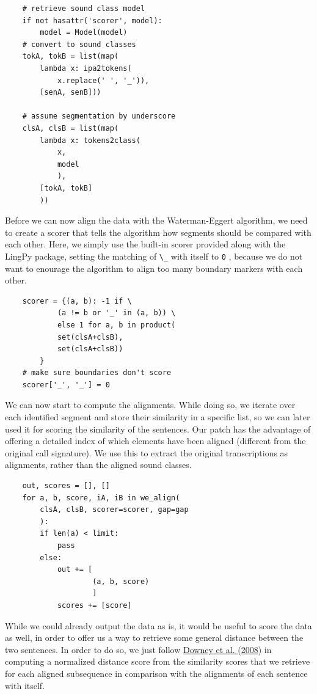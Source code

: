 \documentclass[
  a4paper,
  14pt,
  oneside,
  tablecaptionabove
]{scrbook}
\newcommand{\passthrough}[1]{#1}
\begin{document}
\begin{lstlisting}
    # retrieve sound class model
    if not hasattr('scorer', model):
        model = Model(model)
    # convert to sound classes
    tokA, tokB = list(map(
        lambda x: ipa2tokens(
            x.replace(' ', '_')),
        [senA, senB]))

    # assume segmentation by underscore
    clsA, clsB = list(map(
        lambda x: tokens2class(
            x,
            model
            ),
        [tokA, tokB]
        ))
\end{lstlisting}

Before we can now align the data with the Waterman-Eggert algorithm, we
need to create a scorer that tells the algorithm how segments should be
compared with each other. Here, we simply use the built-in scorer
provided along with the LingPy package, setting the matching of
\passthrough{\lstinline!\_!} with itself to \passthrough{\lstinline!0!}
, because we do not want to enourage the algorithm to align too many
boundary markers with each other.

\begin{lstlisting}
    scorer = {(a, b): -1 if \
            (a != b or '_' in (a, b)) \
            else 1 for a, b in product(
            set(clsA+clsB),
            set(clsA+clsB))
        }
    # make sure boundaries don't score
    scorer['_', '_'] = 0
\end{lstlisting}

We can now start to compute the alignments. While doing so, we iterate
over each identified segment and store their similarity in a specific
list, so we can later used it for scoring the similarity of the
sentences. Our patch has the advantage of offering a detailed index of
which elements have been aligned (different from the original call
signature). We use this to extract the original transcriptions as
alignments, rather than the aligned sound classes.

\begin{lstlisting}
    out, scores = [], []
    for a, b, score, iA, iB in we_align(
        clsA, clsB, scorer=scorer, gap=gap
        ):
        if len(a) < limit:
            pass
        else:
            out += [
                    (a, b, score)
                    ]
            scores += [score]
\end{lstlisting}

While we could already output the data as is, it would be useful to
score the data as well, in order to offer us a way to retrieve some
general distance between the two sentences. In order to do so, we just
follow \href{http://bibliography.lingpy.org?key=Downey2008}{Downey et
al. (2008)} in computing a normalized distance score from the similarity
scores that we retrieve for each aligned subsequence in comparison with
the alignments of each sentence with itself.
\end{document}
